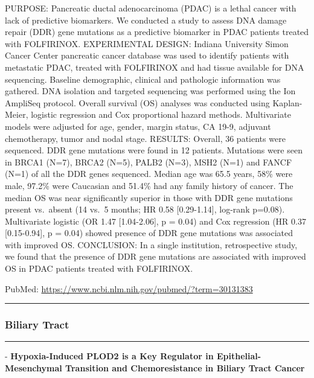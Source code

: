 \documentclass[]{article}
\begin{document}
PURPOSE: Pancreatic ductal adenocarcinoma (PDAC) is a lethal cancer with
lack of predictive biomarkers. We conducted a study to assess DNA damage
repair (DDR) gene mutations as a predictive biomarker in PDAC patients
treated with FOLFIRINOX. EXPERIMENTAL DESIGN: Indiana University Simon
Cancer Center pancreatic cancer database was used to identify patients
with metastatic PDAC, treated with FOLFIRINOX and had tissue available
for DNA sequencing. Baseline demographic, clinical and pathologic
information was gathered. DNA isolation and targeted sequencing was
performed using the Ion AmpliSeq protocol. Overall survival (OS)
analyses was conducted using Kaplan-Meier, logistic regression and Cox
proportional hazard methods. Multivariate models were adjusted for age,
gender, margin status, CA 19-9, adjuvant chemotherapy, tumor and nodal
stage. RESULTS: Overall, 36 patients were sequenced. DDR gene mutations
were found in 12 patients. Mutations were seen in BRCA1 (N=7), BRCA2
(N=5), PALB2 (N=3), MSH2 (N=1) and FANCF (N=1) of all the DDR genes
sequenced. Median age was 65.5 years, 58\% were male, 97.2\% were
Caucasian and 51.4\% had any family history of cancer. The median OS was
near significantly superior in those with DDR gene mutations present
vs.~absent (14 vs.~5 months; HR 0.58 {[}0.29-1.14{]}, log-rank p=0.08).
Multivariate logistic (OR 1.47 {[}1.04-2.06{]}, p = 0.04) and Cox
regression (HR 0.37 {[}0.15-0.94{]}, p = 0.04) showed presence of DDR
gene mutations was associated with improved OS. CONCLUSION: In a single
institution, retrospective study, we found that the presence of DDR gene
mutations are associated with improved OS in PDAC patients treated with
FOLFIRINOX.

PubMed: \url{https://www.ncbi.nlm.nih.gov/pubmed/?term=30131383}

{}

{}

\begin{center}\rule{0.5\linewidth}{\linethickness}\end{center}

\hypertarget{biliary-tract-2}{%
\subsubsection{Biliary Tract}\label{biliary-tract-2}}

\begin{center}\rule{0.5\linewidth}{\linethickness}\end{center}

 - \textbf{Hypoxia-Induced PLOD2 is a Key Regulator in
Epithelial-Mesenchymal Transition and Chemoresistance in Biliary Tract
Cancer}
\end{document}
